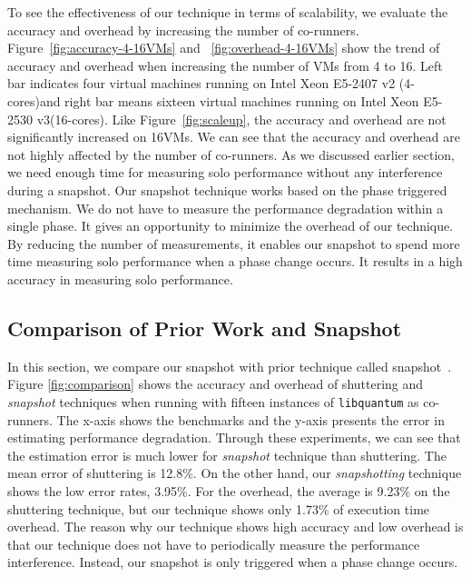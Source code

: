 \documentclass{sig-alternate}
\begin{document}
To see the effectiveness of our technique in terms of scalability, we evaluate the accuracy and overhead by increasing the number of co-runners. Figure~\ref{fig:accuracy-4-16VMs} and ~\ref{fig:overhead-4-16VMs} show the trend of accuracy and overhead when increasing the number of VMs from 4 to 16. Left bar indicates four virtual machines running on Intel Xeon E5-2407 v2 (4-cores)and right bar means sixteen virtual machines running on Intel Xeon E5-2530 v3(16-cores). Like Figure~\ref{fig:scaleup}, the accuracy and overhead are not significantly increased on 16VMs. We can see that the accuracy and overhead are not highly affected by the number of co-runners. As we discussed earlier section, we need enough time for measuring solo performance without any interference during a snapshot. Our snapshot technique works based on the phase triggered mechanism. We do not have to measure the performance degradation within a single phase. It gives an opportunity to minimize the overhead of our technique. By reducing the number of measurements, it enables our snapshot to spend more time measuring solo performance when a phase change occurs. It results in a high accuracy in measuring solo performance.

\subsection{Comparison of Prior Work and Snapshot}
\label{subsec:ComparisonofPriorWorkandSnapshot}

In this section, we compare our snapshot with prior technique called snapshot~\cite{fairpricing}. Figure \ref{fig:comparison} shows the accuracy and overhead of shuttering and \textit{snapshot} techniques when running with fifteen instances of \texttt{libquantum} as co-runners. The x-axis shows the benchmarks and the y-axis presents the error in estimating performance degradation. 
Through these experiments, we can see that the estimation error is much lower for \textit{snapshot} technique than shuttering. 
The mean error of shuttering is 12.8\%. On the other hand, our \textit{snapshotting} technique shows the low error rates, 3.95\%.
For the overhead, the average is 9.23\% on the shuttering technique, but our technique shows only 1.73\% of execution time overhead. The reason why our technique shows high accuracy and low overhead is that our technique does not have to periodically measure the performance interference. Instead, our snapshot is only triggered when a phase change occurs. 
\end{document}
